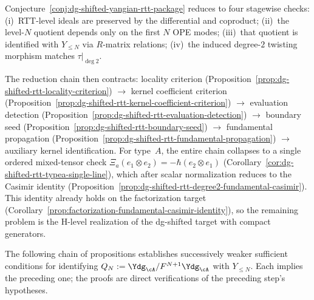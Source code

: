 \begin{remark}
\label{rem:dg-shifted-quotient-route}
Conjecture~\ref{conj:dg-shifted-yangian-rtt-package} reduces to four stagewise checks: (i)~RTT-level ideals are preserved by the differential and coproduct; (ii)~the level-$N$ quotient depends only on the first $N$ OPE modes; (iii)~that quotient is identified with $Y_{\le N}$ via $R$-matrix relations; (iv)~the induced degree-$2$ twisting morphism matches $\tau|_{\deg 2}$.

The reduction chain then contracts: locality criterion (Proposition~\ref{prop:dg-shifted-rtt-locality-criterion}) $\to$ kernel coefficient criterion (Proposition~\ref{prop:dg-shifted-rtt-kernel-coefficient-criterion}) $\to$ evaluation detection (Proposition~\ref{prop:dg-shifted-rtt-evaluation-detection}) $\to$ boundary seed (Proposition~\ref{prop:dg-shifted-rtt-boundary-seed}) $\to$ fundamental propagation (Proposition~\ref{prop:dg-shifted-rtt-fundamental-propagation}) $\to$ auxiliary kernel identification. For type~$A$, the entire chain collapses to a single ordered mixed-tensor check $\Xi_a(e_1\otimes e_2)=-\hbar(e_2\otimes e_1)$ (Corollary~\ref{cor:dg-shifted-rtt-typea-single-line}), which after scalar normalization reduces to the Casimir identity (Proposition~\ref{prop:dg-shifted-rtt-degree2-fundamental-casimir}). This identity already holds on the factorization target (Corollary~\ref{prop:factorization-fundamental-casimir-identity}), so the remaining problem is the H-level realization of the dg-shifted target with compact generators.
\end{remark}

The following chain of propositions establishes successively weaker
sufficient conditions for identifying $Q_N:=\Ydg_{\cA}/F^{N+1}\Ydg_{\cA}$
with $Y_{\le N}$. Each implies the preceding one; the proofs are
direct verifications of the preceding step's hypotheses.

